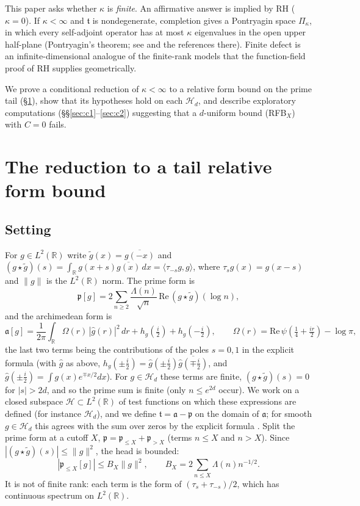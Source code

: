 \documentclass[11pt]{amsart}
\theoremstyle{definition}
\theoremstyle{remark}
\newcommand{\fa}{\mathfrak a}
\newcommand{\fp}{\mathfrak p}
\newcommand{\ft}{\mathfrak t}
\begin{document}
This paper asks whether $\kappa$ is \emph{finite}. An affirmative
answer is implied by RH ($\kappa=0$). If $\kappa<\infty$ and $\ft$ is
nondegenerate, completion gives a Pontryagin space $\Pi_\kappa$, in which every
self-adjoint operator has at most $\kappa$ eigenvalues in the open upper
half-plane (Pontryagin's theorem; see \cite{KL} and the references there). Finite defect is an
infinite-dimensional analogue of the finite-rank models that the function-field
proof of RH supplies geometrically.

We prove a conditional reduction of $\kappa<\infty$ to a relative form bound
on the prime tail (\S\ref{sec:red}), show that its hypotheses hold on each $\mathcal H_d$, and describe
exploratory computations (\S\S\ref{sec:c1}--\ref{sec:c2}) suggesting that a
$d$-uniform bound (RFB$_X$) with $C=0$ fails.

\section{The reduction to a tail relative form bound}\label{sec:red}
\subsection*{Setting}
For $g\in L^2(\mathbb R)$ write $\tilde g(x)=\overline{g(-x)}$ and
$(g\star\tilde g)(s)=\int_{\mathbb R}g(x+s)\overline{g(x)}\,dx=\langle\tau_{-s}g,g\rangle$,
where $\tau_s g(x)=g(x-s)$ and $\|g\|$ is the $L^2(\mathbb R)$ norm. The prime
form is
\[
\fp[g]=2\sum_{n\ge2}\frac{\Lambda(n)}{\sqrt n}\,\mathrm{Re}\,(g\star\tilde g)(\log n),
\]
and the archimedean form is
\[
\fa[g]=\frac1{2\pi}\int_{\mathbb R}\Omega(r)\,|\widehat g(r)|^2\,dr
+h_g(\tfrac i2)+h_g(-\tfrac i2),
\qquad \Omega(r)=\mathrm{Re}\,\psi(\tfrac14+\tfrac{ir}{2})-\log\pi,
\]
the last two terms being the contributions of the poles $s=0,1$ in the explicit
formula \cite{Weil} (with $\widehat g$ as above, $h_g(\pm\tfrac i2)
=\widehat g(\pm\tfrac i2)\overline{\widehat g(\mp\tfrac i2)}$, and
$\widehat g(\pm\tfrac i2)=\int g(x)e^{\mp x/2}dx$). For $g\in\mathcal H_d$
these terms are finite, $(g\star\tilde g)(s)=0$ for $|s|>2d$, and so the prime
sum is finite (only $n\le e^{2d}$ occur). We work on a closed subspace
$\mathcal H\subset L^2(\mathbb R)$ of test functions on which these
expressions are defined (for instance $\mathcal H_d$), and we define
$\ft=\fa-\fp$ on the domain of $\fa$; for smooth $g\in\mathcal H_d$ this agrees
with the sum over zeros by the explicit formula \cite{Weil}. Split the prime form at a cutoff
$X$, $\fp=\fp_{\le X}+\fp_{>X}$ (terms $n\le X$ and $n>X$). Since
$|(g\star\tilde g)(s)|\le\|g\|^2$, the head is bounded:
\begin{equation}\label{eq:head}
|\fp_{\le X}[g]|\le B_X\|g\|^2,\qquad B_X=2\sum_{n\le X}\Lambda(n)n^{-1/2}.
\end{equation}
It is not of finite rank: each term is the form of $(\tau_s+\tau_{-s})/2$,
which has continuous spectrum on $L^2(\mathbb R)$.
\end{document}
